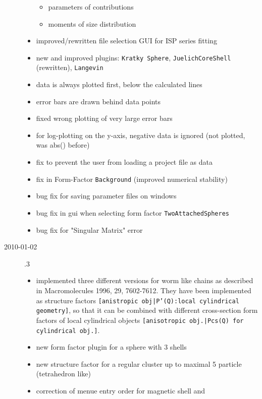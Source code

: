 \begin{description}
\begin{itemize}
\begin{itemize}
                \item parameters of contributions
                \item moments of size distribution
            \end{itemize}
            \item  improved/rewritten file selection GUI for ISP series fitting
            \item  new and improved plugins: \texttt{Kratky Sphere}, \texttt{JuelichCoreShell} (rewritten), \texttt{Langevin}
            \item data is always plotted first, below the calculated lines
            \item error bars are drawn behind data points
            \item fixed wrong plotting of very large error bars
            \item for log-plotting on the y-axis, negative data is ignored (not plotted, was abs() before)
            \item fix to prevent the user from loading a \SASfit project file as data
            \item fix in Form-Factor \texttt{Background} (improved numerical stability)
            \item bug fix for saving parameter files on windows
            \item bug fix in gui when selecting form factor \texttt{TwoAttachedSpheres}
            \item bug fix for "Singular Matrix" error
        \end{itemize}
    \item[2010-01-02] .3
        \begin{itemize}
        \item implemented three different versions for worm like chains as
              described in Macromolecules 1996, 29, 7602-7612. They have
              been implemented as structure factors
              \texttt{[anistropic obj|P'(Q):local cylindrical geometry]},
              so that it can be combined with different cross-section
              form factors of local cylindrical objects
              \texttt{[anisotropic obj.|Pcs(Q) for cylindrical obj.]}.
        \item new form factor plugin for a sphere with 3 shells
        \item new structure factor for a regular cluster up to maximal 5 particle
              (tetrahedron like)
        \item correction of menue entry order for magnetic shell and

\end{itemize}
\end{description}
